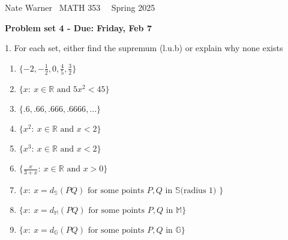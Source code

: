 \documentclass{report}
\title{\Huge{}}
\author{\huge{Nathan Warner}}
\date{\huge{}}
\begin{document}
    \pagebreak \bigbreak \noindent
    Nate Warner \ \quad \quad \quad \quad \quad \quad \quad \quad \quad \quad \quad \quad  MATH 353 \quad  \quad \quad \quad \quad \quad \quad \quad \quad \ \ \quad \quad Spring 2025
    \begin{center}
        \textbf{Problem set 4 - Due: Friday, Feb 7}
    \end{center}
    \bigbreak \noindent 
    \begin{mdframed}
        1. For each set, either find the supremum (l.u.b) or explain why none exists
        \begin{enumerate}[label=(\alph*)]
            \item $\{-2,-\frac{1}{2}, 0,\frac{4}{5},\frac{3}{2}\} $
            \item $\{x:\ x\in \mathbb{R} \text{ and } 5x^{2} < 45\} $
            \item $\{.6,.66,.666,.6666,...\} $
            \item $\{x^{2}:\ x\in\mathbb{R} \text{ and } x<2\} $
            \item $\{x^{3}:\ x\in\mathbb{R} \text{ and } x<2\} $
            \item $\{\frac{x}{3+x}:\ x\in \mathbb{R} \text{ and } x>0\} $
            \item $\{x:\ x=d_{\mathbb{S}}(PQ) \text{ for some  points $P,Q$ in $\mathbb{S} $(radius 1) }\} $
            \item $\{x:\ x=d_{\mathbb{M}}(PQ) \text{ for some  points $P,Q$ in $\mathbb{M} $}\} $
            \item $\{x:\ x=d_{\mathbb{G}}(PQ) \text{ for some  points $P,Q$ in $\mathbb{G} $}\} $
        \end{enumerate}
    \end{mdframed}
\end{document}
